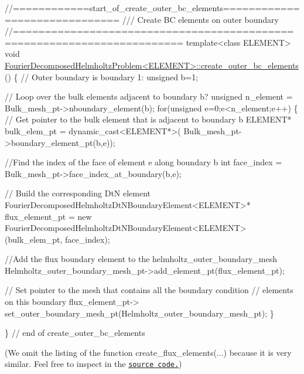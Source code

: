  
\begin{DoxyCodeInclude}
\textcolor{comment}{//============start\_of\_create\_outer\_bc\_elements==============================}
\textcolor{comment}{/// Create BC elements on outer boundary}
\textcolor{comment}{}\textcolor{comment}{//========================================================================}
\textcolor{keyword}{template}<\textcolor{keyword}{class} ELEMENT>
\textcolor{keywordtype}{void} \hyperlink{classFourierDecomposedHelmholtzProblem_a359d402bb4aed7d83973248d82085efb}{FourierDecomposedHelmholtzProblem<ELEMENT>::create\_outer\_bc\_elements}
      ()
\{
 \textcolor{comment}{// Outer boundary is boundary 1:}
 \textcolor{keywordtype}{unsigned} b=1;

 \textcolor{comment}{// Loop over the bulk elements adjacent to boundary b?}
 \textcolor{keywordtype}{unsigned} n\_element = Bulk\_mesh\_pt->nboundary\_element(b);
 \textcolor{keywordflow}{for}(\textcolor{keywordtype}{unsigned} e=0;e<n\_element;e++)
  \{
   \textcolor{comment}{// Get pointer to the bulk element that is adjacent to boundary b}
   ELEMENT* bulk\_elem\_pt = \textcolor{keyword}{dynamic\_cast<}ELEMENT*\textcolor{keyword}{>}(
    Bulk\_mesh\_pt->boundary\_element\_pt(b,e));
   
   \textcolor{comment}{//Find the index of the face of element e along boundary b }
   \textcolor{keywordtype}{int} face\_index = Bulk\_mesh\_pt->face\_index\_at\_boundary(b,e);
   
   \textcolor{comment}{// Build the corresponding DtN element}
   FourierDecomposedHelmholtzDtNBoundaryElement<ELEMENT>* flux\_element\_pt = \textcolor{keyword}{new} 
    FourierDecomposedHelmholtzDtNBoundaryElement<ELEMENT>(bulk\_elem\_pt,
                                                          face\_index);
   
   \textcolor{comment}{//Add the flux boundary element to the  helmholtz\_outer\_boundary\_mesh}
   Helmholtz\_outer\_boundary\_mesh\_pt->add\_element\_pt(flux\_element\_pt);

   \textcolor{comment}{// Set pointer to the mesh that contains all the boundary condition}
   \textcolor{comment}{// elements on this boundary}
   flux\_element\_pt->
    set\_outer\_boundary\_mesh\_pt(Helmholtz\_outer\_boundary\_mesh\_pt);
  \}

\} \textcolor{comment}{// end of create\_outer\_bc\_elements}

\end{DoxyCodeInclude}


(We omit the listing of the function {\ttfamily create\+\_\+flux\+\_\+elements}(...) because it is very similar. Feel free to inspect in the \href{../../../../demo_drivers/fourier_decomposed_helmholtz/sphere_scattering/sphere_scattering.cc}{\tt source code.})



